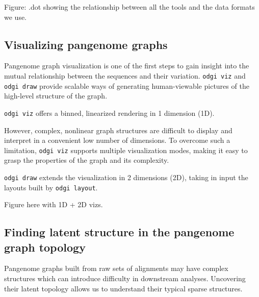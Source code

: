 \documentclass{bioinfo}
\begin{document}
Figure: .dot showing the relationship between all the tools and the data formats we use.

\subsection{Visualizing pangenome graphs}



Pangenome graph visualization is one of the first steps to gain insight into the mutual relationship between the sequences and their variation.
\texttt{odgi viz} and \texttt{odgi draw} provide scalable ways of generating human-viewable pictures of the high-level structure of the graph.

\texttt{odgi viz} offers a binned, linearized rendering in 1 dimension (1D).


However, complex, nonlinear graph structures are difficult to display and interpret in a convenient low number of dimensions.
To overcome such a limitation, \texttt{odgi viz} supports multiple visualization modes, making it easy to grasp the properties of the graph and its complexity.


\texttt{odgi draw} extends the visualization in 2 dimensions (2D), taking in input the layouts built by \texttt{odgi layout}.


Figure here with 1D + 2D vizs.

\subsection{Finding latent structure in the pangenome graph topology}




Pangenome graphs built from raw sets of alignments may have complex structures which can introduce difficulty in downstream analyses. Uncovering their latent topology allows us to understand their typical sparse structures.
\end{document}
